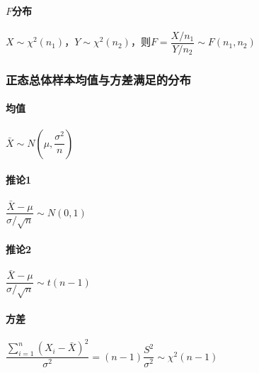 \paragraph{$F$分布}

$X \sim \chi^{2} (n_{1})$，$Y \sim \chi^{2} (n_{2})$，则$F=\dfrac{X/n_{1}}{Y/n_{2}} \sim F \left( n_{1},n_{2} \right)$


\subsubsection{正态总体样本均值与方差满足的分布}
\label{sec:790103959290}
\paragraph{均值}
$\bar{X} \sim N \left( \mu, \dfrac{\sigma^{2}}{n} \right)$

\paragraph{推论1}
$\dfrac{\bar{X}-\mu}{\sigma / \sqrt{n}} \sim N(0,1)$

\paragraph{推论2}
$\dfrac{\bar{X}-\mu}{\sigma / \sqrt{n}} \sim t(n-1)$

\paragraph{方差}
$\dfrac{\sum\limits_{i=1}^{n} \left( X_{i} - \bar{X} \right)^{2}}{\sigma^{2}} = (n-1) \dfrac{S^{2}}{\sigma^{2}} \sim \chi^{2} (n-1)$



